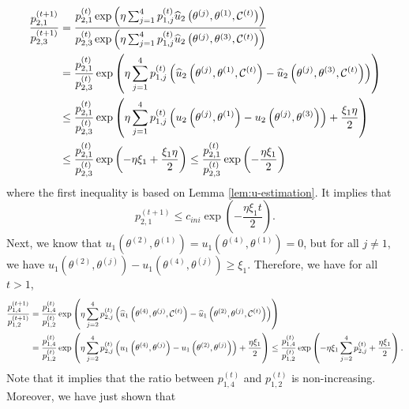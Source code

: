 \begin{equation*}
\begin{split}
    \frac{p^{(t+1)}_{2,1}}{p^{(t+1)}_{2,3}}  = {} & \frac{p^{(t)}_{2,1}\exp\left(\eta \sum_{j=1}^4 p_{1,j}^{(t)}\widehat{u}_2\left(\theta^{(j)},\theta^{(1)},\mathcal{C}^{(t)}\right) \right)}{p^{(t)}_{2,3}\exp\left(\eta \sum_{j=1}^4 p_{1,j}^{(t)}\widehat{u}_2\left(\theta^{(j)},\theta^{(3)},\mathcal{C}^{(t)}\right) \right)}\\
    = {} & \frac{p^{(t)}_{2,1}}{p_{2,3}^{(t)}}\exp\left(\eta \sum_{j=1}^4 p_{1,j}^{(t)}\left(\widehat{u}_2\left(\theta^{(j)},\theta^{(1)},\mathcal{C}^{(t)}\right) - \widehat{u}_2\left(\theta^{(j)},\theta^{(3)},\mathcal{C}^{(t)}\right)\right) \right)\\
    \leq {} & \frac{p^{(t)}_{2,1}}{p_{2,3}^{(t)}}\exp\left(\eta \sum_{j=1}^4 p_{1,j}^{(t)}\left({u}_2\left(\theta^{(j)},\theta^{(1)}\right) - {u}_2\left(\theta^{(j)},\theta^{(3)}\right)\right) + \frac{\xi_1\eta}{2}\right)\\
    \leq {} & \frac{p^{(t)}_{2,1}}{p_{2,3}^{(t)}}\exp\left( -\eta\xi_1 +\frac{\xi_1\eta}{2} \right)\leq  \frac{p^{(t)}_{2,1}}{p_{2,3}^{(t)}}\exp\left( -\frac{\eta\xi_1}{2} \right)
\end{split}
\end{equation*}
where the first inequality is based on Lemma \ref{lem:u-estimation}. It implies that 
\[
{p^{(t+1)}_{2,1}}\leq c_{ini}\exp\left(-\frac{\eta\xi_1t}{2}\right).
\]
Next, we know that $u_1(\theta^{(2)},\theta^{(1)})=u_1(\theta^{(4)},\theta^{(1)})=0$, but for all $j \neq 1$, we have $u_1\left(\theta^{(2)},\theta^{(j)}\right) - u_1\left(\theta^{(4)},\theta^{(j)}\right) \geq \xi_1$. Therefore, we have for all $t>1$,
\begin{equation*}
   \begin{split}
\frac{p^{(t+1)}_{1,4}}{p^{(t+1)}_{1,2}} = {} &     \frac{p^{(t)}_{1,4}}{p^{(t)}_{1,2}} \exp\left(\eta \sum_{j=2}^4 p^{(t)}_{2,j}\left(\widehat{u}_1\left(\theta^{(4)},\theta^{(j)},\mathcal{C}^{(t)}\right)-\widehat{u}_1\left(\theta^{(2)},\theta^{(j)},\mathcal{C}^{(t)}\right)\right) \right)\\
=  {} &   \frac{p^{(t)}_{1,4}}{p^{(t)}_{1,2}} \exp\left(\eta \sum_{j=2}^4 p^{(t)}_{2,j}\left(u_1\left(\theta^{(4)},\theta^{(j)}\right)-u_1\left(\theta^{(2)},\theta^{(j)}\right)\right) +\frac{\eta\xi_1}{2}\right)\leq \frac{p^{(t)}_{1,4}}{p^{(t)}_{1,2}} \exp\left(-\eta \xi_1\sum_{j=2}^4 p^{(t)}_{2,j}+\frac{\eta\xi_1}{2} \right).
   \end{split} 
\end{equation*}
Note that it implies that the ratio between $p_{1,4}^{(t)}$ and $p_{1,2}^{(t)}$ is non-increasing. Moreover, we have just shown that
